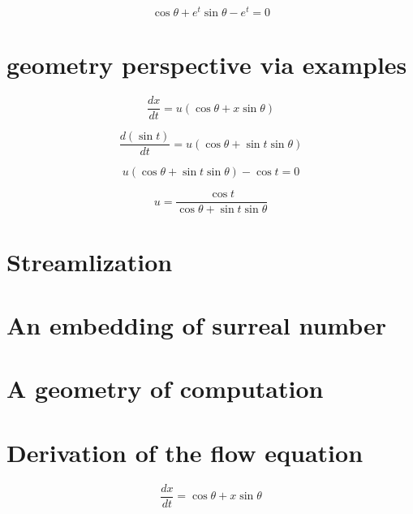 \documentclass{article}
\begin{document}
\begin{equation}
     \cos \theta + e^t \sin \theta - e^t = 0
\end{equation}

\section{geometry perspective via examples}\label{sec:gpve}

\begin{equation}
    \frac{dx}{dt} = u (\cos \theta + x \sin \theta)
\end{equation}

\begin{equation}
    \frac{d(\sin t)}{dt} = u(\cos \theta + \sin t \sin \theta)
\end{equation}

\begin{equation}
    u(\cos \theta + \sin t \sin \theta) - \cos t = 0
\end{equation}

\begin{equation}
    u = \frac{\cos t}{\cos \theta + \sin t \sin \theta}
\end{equation}

\section{Streamlization}\label{sec:soada}

\section{An embedding of surreal number}\label{sec:aeosn}

\section{A geometry of computation}\label{sec:gioc}




\appendix

\section{Derivation of the flow equation}

\begin{equation}
    \frac{dx}{dt} = \cos \theta + x \sin \theta
\end{equation}
\end{document}

